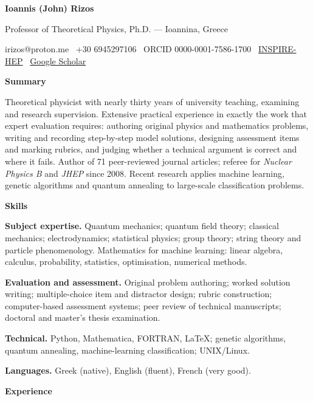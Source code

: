 \documentclass[a4paper,10.5pt]{article}
\newcommand{\sect}[1]{%
  \vspace{9pt}%
  {\large\bfseries #1}\par
  \vspace{2pt}{\color{rule}\hrule height 0.6pt}\vspace{6pt}%
}
\begin{document}
{\huge\bfseries Ioannis (John) Rizos}\par
\vspace{3pt}
Professor of Theoretical Physics, Ph.D. --- Ioannina, Greece\par
\vspace{2pt}
irizos@proton.me \textbullet\ +30 6945297106 \textbullet\
ORCID 0000-0001-7586-1700 \textbullet\
\href{https://inspirehep.net/authors/991609}{INSPIRE-HEP} \textbullet\
\href{https://scholar.google.com/citations?user=7TJ7ZnAAAAAJ}{Google Scholar}

\sect{Summary}

Theoretical physicist with nearly thirty years of university teaching,
examining and research supervision. Extensive practical experience in
exactly the work that expert evaluation requires: authoring original
physics and mathematics problems, writing and recording step-by-step
model solutions, designing assessment items and marking rubrics, and
judging whether a technical argument is correct and where it fails.
Author of 71 peer-reviewed journal articles; referee for
\textit{Nuclear Physics B} and \textit{JHEP} since 2008. Recent research
applies machine learning, genetic algorithms and quantum annealing to
large-scale classification problems.

\sect{Skills}

\textbf{Subject expertise.} Quantum mechanics; quantum field theory;
classical mechanics; electrodynamics; statistical physics; group theory;
string theory and particle phenomenology. Mathematics for machine
learning: linear algebra, calculus, probability, statistics,
optimisation, numerical methods.

\vspace{3pt}
\textbf{Evaluation and assessment.} Original problem authoring; worked
solution writing; multiple-choice item and distractor design; rubric
construction; computer-based assessment systems; peer review of
technical manuscripts; doctoral and master's thesis examination.

\vspace{3pt}
\textbf{Technical.} Python, Mathematica, FORTRAN, \LaTeX;
genetic algorithms, quantum annealing, machine-learning classification;
UNIX/Linux.

\vspace{3pt}
\textbf{Languages.} Greek (native), English (fluent), French (very good).

\sect{Experience}
\end{document}
